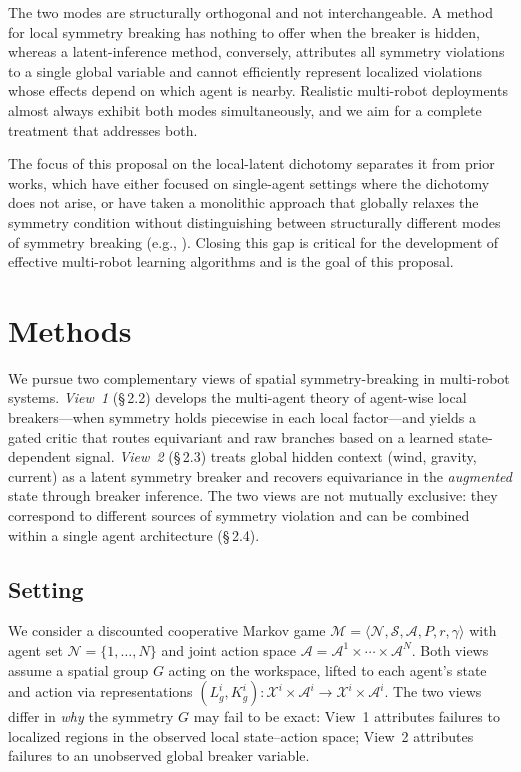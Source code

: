 \documentclass[11pt]{article}
\begin{document}
The two modes are structurally orthogonal and not interchangeable. A method for local symmetry breaking has nothing to offer when the breaker is hidden, whereas a latent-inference method, conversely, attributes all symmetry violations to a single global variable and cannot efficiently represent localized violations whose effects depend on which agent is nearby. Realistic multi-robot deployments almost always exhibit both modes simultaneously, and we aim for a complete treatment that addresses both.

The focus of this proposal on the local-latent dichotomy separates it from prior works, which have either focused on single-agent settings where the dichotomy does not arise, or have taken a monolithic approach that globally relaxes the symmetry condition without distinguishing between structurally different modes of symmetry breaking (e.g., \citep{finzi2021rpp,wang2022approx,romero2022partial,vanderouderaa2022relaxing,hofgard2024relaxed,park2025approximate}).
Closing this gap is critical for the development of effective multi-robot learning algorithms and is the goal of this proposal.

\section{Methods}
We pursue two complementary views of spatial symmetry-breaking in multi-robot
systems. \textit{View~1} (\S\,2.2) develops the multi-agent theory of agent-wise local
breakers---when symmetry holds piecewise in each local factor---and yields a
gated critic that routes equivariant and raw branches based on a learned
state-dependent signal. \textit{View~2} (\S\,2.3) treats global hidden context (wind,
gravity, current) as a latent symmetry breaker and recovers equivariance in
the \textit{augmented} state through breaker inference. The two views are not
mutually exclusive: they correspond to different sources of symmetry violation
and can be combined within a single agent architecture (\S\,2.4).

\subsection*{Setting}

We consider a discounted cooperative Markov game
$\mathcal{M} = \langle \mathcal{N}, \mathcal{S}, \mathcal{A}, P, r, \gamma\rangle$
with agent set $\mathcal{N} = \{1, \dots, N\}$ and joint action space
$\mathcal{A} = \mathcal{A}^1 \times \cdots \times \mathcal{A}^N$. Both views
assume a spatial group $G$ acting on the workspace, lifted to each agent's
state and action via representations
$(L_g^i, K_g^i)\colon \mathcal{X}^i \times \mathcal{A}^i \to \mathcal{X}^i \times \mathcal{A}^i$.
The two views differ in \textit{why} the symmetry $G$ may fail to be exact: View~1
attributes failures to localized regions in the observed local state--action
space; View~2 attributes failures to an unobserved global breaker variable.
\end{document}
